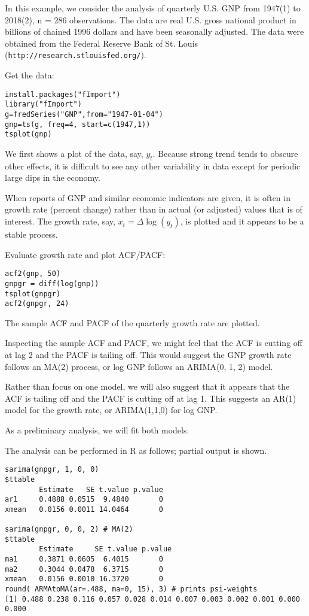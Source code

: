 \documentclass[
paper=128mm:96mm, %
fontsize=9.5pt, %
pagesize, %
parskip=half-, %
]{scrartcl} %
\theoremstyle{mythmstyle} %
\begin{document}
In this example, we consider the analysis of quarterly U.S. GNP from 1947(1) to 2018(2), n = 286 observations. The data are real U.S. gross national product in billions of chained 1996 dollars and have been seasonally adjusted. The data were obtained from the Federal Reserve Bank of St. Louis 
(\texttt{http://research.stlouisfed.org/}). 

Get the data:
\begin{lstlisting}[belowskip=-0.8 \baselineskip]
install.packages("fImport")
library("fImport")
g=fredSeries("GNP",from="1947-01-04")
gnp=ts(g, freq=4, start=c(1947,1))
tsplot(gnp)
\end{lstlisting}
\clearpage

We first shows a plot of the data, say, $y_t$. Because strong trend tends to obscure other effects, it is difficult to see any other variability in data except for periodic large dips in the economy. 

When reports of GNP and similar economic indicators are given, it is often in growth rate (percent change) rather than in actual (or adjusted) values that is of interest. The growth rate, say, $x_t = \Delta\log(y_t)$, is plotted and it appears to be a stable process.

Evaluate growth rate and plot ACF/PACF:
%
\begin{lstlisting}[belowskip=-0.8 \baselineskip]
acf2(gnp, 50)
gnpgr = diff(log(gnp))
tsplot(gnpgr)
acf2(gnpgr, 24)
\end{lstlisting}
\clearpage

The sample ACF and PACF of the quarterly growth rate are plotted. 

Inspecting the sample ACF and PACF, we might feel that the ACF is cutting off at lag 2 and the PACF is tailing off. This would suggest the GNP growth rate follows an MA(2) process, or log GNP follows an ARIMA(0, 1, 2) model. 

Rather than focus on one model, we will also suggest that it appears that 
the ACF is tailing off and the PACF is cutting off at lag 1. This suggests an AR(1) model for the growth rate, or ARIMA(1,1,0) for log GNP. 

As a preliminary analysis, we will fit both models.
\clearpage

The analysis can be performed in R as follows; partial output is shown.

\begin{lstlisting}[belowskip=-0.8 \baselineskip]
sarima(gnpgr, 1, 0, 0)
$ttable
        Estimate   SE t.value p.value
ar1     0.4888 0.0515  9.4840       0
xmean   0.0156 0.0011 14.0464       0

sarima(gnpgr, 0, 0, 2) # MA(2) 
$ttable
        Estimate     SE t.value p.value
ma1     0.3871 0.0605  6.4015       0
ma2     0.3044 0.0478  6.3715       0
xmean   0.0156 0.0010 16.3720       0
round( ARMAtoMA(ar=.488, ma=0, 15), 3) # prints psi-weights
[1] 0.488 0.238 0.116 0.057 0.028 0.014 0.007 0.003 0.002 0.001 0.000 0.000
\end{lstlisting}
\clearpage
\end{document}
